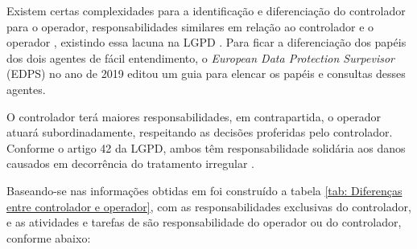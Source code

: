 \documentclass[
	12pt,				%
	openright,			%
	oneside,			%
	a4paper,			%
	english,			%
	french,				%
	spanish,			%
	brazil,				%
	]{abntex2}
\begin{document}
Existem certas complexidades para a identificação e diferenciação do controlador para o operador, responsabilidades similares em relação ao controlador e o operador \cite{Blum2020}, existindo essa lacuna na LGPD \cite{Alves2020}. Para ficar a diferenciação dos papéis dos dois agentes de fácil entendimento, o \textit{European Data Protection Surpevisor} (EDPS) no ano de 2019 editou um guia para elencar os papéis e consultas desses agentes. 

O controlador terá maiores responsabilidades, em contrapartida, o operador atuará subordinadamente, respeitando as decisões proferidas pelo controlador. Conforme o artigo 42 da LGPD, ambos têm responsabilidade solidária aos danos causados em decorrência do tratamento irregular \cite{01-01-LeiGeral}. 

Baseando-se nas informações obtidas em \cite{Alves2020}  foi construído a tabela \ref{tab: Diferenças entre controlador e operador}, com as responsabilidades exclusivas do controlador, e as atividades e tarefas de são responsabilidade do operador ou do controlador, conforme abaixo:
\end{document}
